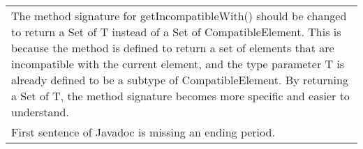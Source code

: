 \begin{table*}[!htbp]
\begin{tabularx}{1\linewidth}{|X|}
{\midrule

\multicolumn{1}{c}{\textbf{LBS}} \\\midrule
The method signature for getIncompatibleWith() should be changed to return a Set of T instead of a Set of CompatibleElement. This is because the method is defined to return a set of elements that are incompatible with the current element, and the type parameter T is already defined to be a subtype of CompatibleElement. By returning a Set of T, the method signature becomes more specific and easier to understand.
\midrule

\multicolumn{1}{c}{\textbf{KBS}} \\\midrule
First sentence of Javadoc is missing an ending period.


\bottomrule

\end{tabularx}
\end{table*}




